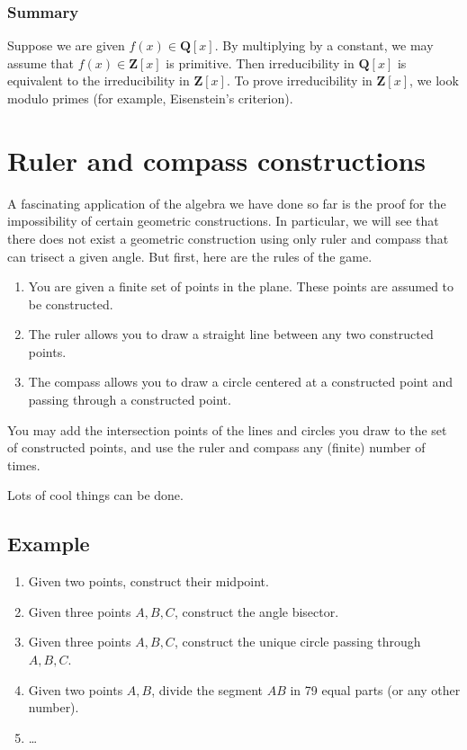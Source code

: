 \documentclass[11pt]{article}
\begin{document}
\subsubsection{Summary}
\label{sec:org90f0eee}
Suppose we are given \(f(x) \in \mathbf{Q}[x]\).
By multiplying by a constant, we may assume that \(f(x) \in \mathbf{Z}[x]\) is primitive.
Then irreducibility in \(\mathbf{Q}[x]\) is equivalent to the irreducibility in \(\mathbf{Z}[x]\).
To prove irreducibility in \(\mathbf{Z}[x]\), we look modulo primes (for example, Eisenstein's criterion).
\section{Ruler and compass constructions}
\label{sec:org0107d07}
A fascinating application of the algebra we have done so far is the proof for the impossibility of certain geometric constructions.
In particular, we will see that there does not exist a geometric construction using only ruler and compass that can trisect a given angle.
But first, here are the rules of the game.

\begin{enumerate}
\item You are given a finite set of points in the plane.  These points are assumed to be constructed.
\item The ruler allows you to draw a straight line between any two constructed points.
\item The compass allows you to draw a circle centered at a constructed point and passing through a constructed point.
\end{enumerate}

You may add the intersection points of the lines and circles you draw to the set of constructed points, and use the ruler and compass any (finite) number of times.

Lots of cool things can be done.  
\subsection{Example}
\label{sec:orgecae7f6}
\begin{enumerate}
\item Given two points, construct their midpoint.
\item Given three points \(A, B, C\), construct the angle bisector.
\item Given three points \(A, B, C\), construct the unique circle passing through \(A, B, C\).
\item Given two points \(A, B\), divide the segment \(AB\) in 79 equal parts (or any other number).
\item \ldots{}
\end{enumerate}
\end{document}
